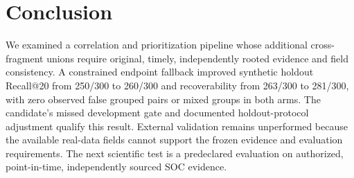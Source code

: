 \section{Conclusion}
We examined a correlation and prioritization pipeline whose additional cross-fragment unions require original, timely, independently rooted evidence and field consistency. A constrained endpoint fallback improved synthetic holdout Recall@20 from 250/300 to 260/300 and recoverability from 263/300 to 281/300, with zero observed false grouped pairs or mixed groups in both arms. The candidate's missed development gate and documented holdout-protocol adjustment qualify this result. External validation remains unperformed because the available real-data fields cannot support the frozen evidence and evaluation requirements. The next scientific test is a predeclared evaluation on authorized, point-in-time, independently sourced SOC evidence.
